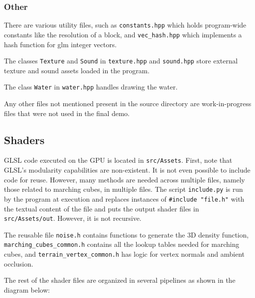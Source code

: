 \documentclass {article}
\begin{document}
\subsubsection{Other}

There are various utility files, such as \texttt{constants.hpp} which holds program-wide constants like the resolution of a block, and \texttt{vec\_hash.hpp} which implements a hash function for glm integer vectors.

The classes \texttt{Texture}  and \texttt{Sound} in \texttt{texture.hpp} and \texttt{sound.hpp} store external texture and sound assets loaded in the program.

The class \texttt{Water} in \texttt{water.hpp} handles drawing the water.

Any other files not mentioned present in the source directory are work-in-progress files that were not used in the final demo.

\subsection{Shaders}

GLSL code executed on the GPU is located in \texttt{src/Assets}. First, note that GLSL's modularity capabilities are non-existent. It is not even possible to include code for reuse. However, many methods are needed across multiple files, namely those related to marching cubes, in multiple files. The script \texttt{include.py} is run by the program at execution and replaces instances of \verb|#include "file.h"| with the textual content of the file and puts the output shader files in \texttt{src/Assets/out}. However, it is not recursive.

The reusable file \texttt{noise.h} contains functions to generate the 3D density function, \texttt{marching\_cubes\_common.h} contains all the lookup tables needed for marching cubes, and \texttt{terrain\_vertex\_common.h} has logic for vertex normals and ambient occlusion.

The rest of the shader files are organized in several pipelines as shown in the diagram below:

\vspace{5mm}
\end{document}
